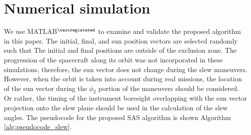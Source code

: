 \documentclass[letterpaper, paper,12pt]{AAS}		%
\begin{document}
\section{Numerical simulation} 
We use  MATLAB$^{\textregistered}$ to examine and validate the proposed algorithm in this paper. The initial, final, and sun position vectors are selected randomly such that The initial and final positions are outside of the exclusion zone. The progression of the spacecraft along its orbit was not incorporated in these simulations, therefore, the sun vector does not change during the slew maneuvers. However, when the orbit is taken into account during real missions, the location of the sun vector during the $\phi_2$ portion of the maneuvers should be considered. Or rather, the timing of the instrument boresight overlapping with the sun vector projection onto the slew plane should be used in the calculation of the slew angles. 
The pseudocode for the proposed SAS algorithm is shown Algorithm \ref{alg:pseudocode_slew}.   
	
\end{document}
